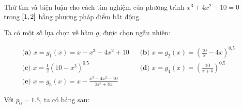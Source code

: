 \documentclass[../../Lectures.tex]{subfiles}
\begin{document}
\begin{exmp}
    Thử tìm và biện luận cho cách tìm nghiệm của phương trình \(x^3 + 4x^2 - 10
    = 0\) trong \(\interval{1}{2}\) bằng \hyperref[method:fixed_point]{phương
    pháp điểm bất động}.

    Ta có một số lựa chọn về hàm \(g\), được chọn ngẫu nhiên:

    \[\begin{aligned}
        &\textbf{(a) } x = g_1(x) = x - x^3 -4x^2 + 10   &&\textbf{(b) } x = g_2(x) = \left(\frac{10}{x} - 4x \right)^{0.5}  \\
        &\textbf{(c) } x = \frac{1}{2} (10 - x^3)^{0.5}  &&\textbf{(d) } x = g_4(x) = \left(\frac{10}{x + 4} \right)^{0.5}   \\
        &\textbf{(e) } x = g_5(x) = x - \frac{x^3 + 4x^2 - 10}{3x^2 + 8x}
    \end{aligned}\]

    Với \(p_0 = 1.5\), ta có bảng sau:


\end{exmp}
\end{document}
